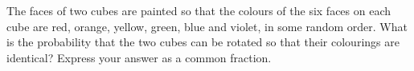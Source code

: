 The faces of two cubes are painted so that the colours of the six faces on each cube are red, orange, yellow, green, blue and violet, in some random order. What is the probability that the two cubes can be rotated so that their colourings are identical? Express your answer as a common fraction.
